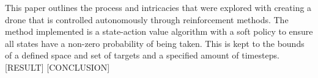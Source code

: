 This paper outlines the process and intricacies that were explored with creating a drone that is controlled autonomously through reinforcement methods. The method implemented is a state-action value algorithm with a soft policy to ensure all states have a non-zero probability of being taken. This is kept to the bounds of a defined space and set of targets and a specified amount of timesteps. [RESULT] [CONCLUSION]